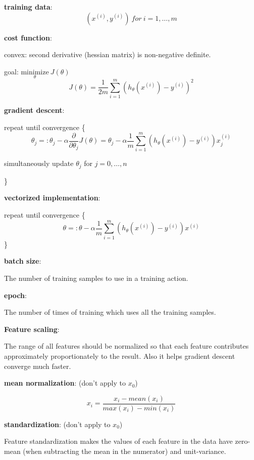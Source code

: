 \documentclass{article}
\begin{document}
\noindent \textbf{training data}:
\[(x^{(i)}, y^{(i)})\:for\:i = 1, \dots, m\]

\noindent \textbf{cost function}:

\noindent convex: second derivative (hessian matrix) is non-negative definite.

\noindent goal: \(\underset{\theta}{\text{minimize}} \: J(\theta)\)
\[J(\theta) = \frac{1}{2m} \sum_{i = 1}^m (h_{\theta}(x^{(i)}) - y^{(i)})^2\]

\noindent \textbf{gradient descent}:

\noindent repeat until convergence \{
\[\theta_j =: \theta_j - \alpha \frac{\partial}{\partial \theta_j} J(\theta) = \theta_j - \alpha \frac{1}{m} \sum_{i = 1}^m (h_{\theta}(x^{(i)}) - y^{(i)}) x^{(i)}_j\]
\centerline{simultaneously update \(\theta_j\) for \(j = 0, \dots, n\)}
\}

\bigskip

\noindent \textbf{vectorized implementation}:

\noindent repeat until convergence \{
\[\theta =: \theta - \alpha \frac{1}{m} \sum_{i = 1}^m (h_{\theta}(x^{(i)}) - y^{(i)}) x^{(i)}\]
\}

\bigskip

\noindent \textbf{batch size}:

\noindent The number of training samples to use in a training action.

\bigskip

\noindent \textbf{epoch}:

\noindent The number of times of training which uses all the training samples.

\bigskip

\noindent \textbf{Feature scaling}:

\noindent The range of all features should be normalized so that each feature contributes approximately proportionately to the result. Also it helps gradient descent converge much faster.

\bigskip

\noindent \textbf{mean normalization}: (don't apply to \(x_0\))

\[x_i = \frac{x_i - mean(x_i)}{max(x_i) - min(x_i)}\]

\bigskip

\noindent \textbf{standardization}: (don't apply to \(x_0\))

\noindent Feature standardization makes the values of each feature in the data have zero-mean (when subtracting the mean in the numerator) and unit-variance.
\end{document}
